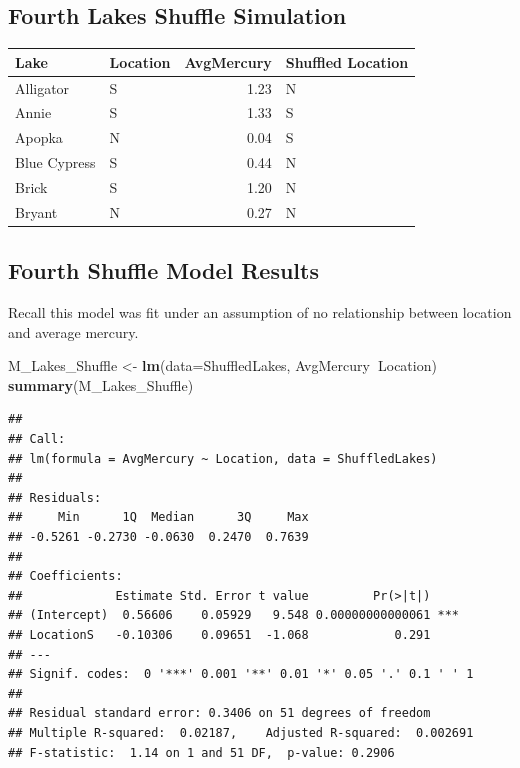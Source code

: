 \documentclass[]{book}
\newenvironment{Shaded}{\begin{snugshade}}{\end{snugshade}}
\newcommand{\KeywordTok}[1]{\textcolor[rgb]{0.13,0.29,0.53}{\textbf{#1}}}
\newcommand{\DataTypeTok}[1]{\textcolor[rgb]{0.13,0.29,0.53}{#1}}
\newcommand{\DecValTok}[1]{\textcolor[rgb]{0.00,0.00,0.81}{#1}}
\newcommand{\StringTok}[1]{\textcolor[rgb]{0.31,0.60,0.02}{#1}}
\newcommand{\OperatorTok}[1]{\textcolor[rgb]{0.81,0.36,0.00}{\textbf{#1}}}
\newcommand{\NormalTok}[1]{#1}
\begin{document}
\subsection{Fourth Lakes Shuffle
Simulation}\label{fourth-lakes-shuffle-simulation}

\begin{Shaded}
\end{Shaded}

\begin{tabular}{l|l|r|l}
\hline
Lake & Location & AvgMercury & Shuffled Location\\
\hline
Alligator & S & 1.23 & N\\
\hline
Annie & S & 1.33 & S\\
\hline
Apopka & N & 0.04 & S\\
\hline
Blue Cypress & S & 0.44 & N\\
\hline
Brick & S & 1.20 & N\\
\hline
Bryant & N & 0.27 & N\\
\hline
\end{tabular}

\subsection{Fourth Shuffle Model
Results}\label{fourth-shuffle-model-results}

Recall this model was fit under an assumption of no relationship between
location and average mercury.

\begin{Shaded}
\begin{Highlighting}[]
\NormalTok{M_Lakes_Shuffle <-}\StringTok{ }\KeywordTok{lm}\NormalTok{(}\DataTypeTok{data=}\NormalTok{ShuffledLakes, AvgMercury}\OperatorTok{~}\NormalTok{Location)}
\KeywordTok{summary}\NormalTok{(M_Lakes_Shuffle)}
\end{Highlighting}
\end{Shaded}

\begin{verbatim}
## 
## Call:
## lm(formula = AvgMercury ~ Location, data = ShuffledLakes)
## 
## Residuals:
##     Min      1Q  Median      3Q     Max 
## -0.5261 -0.2730 -0.0630  0.2470  0.7639 
## 
## Coefficients:
##             Estimate Std. Error t value         Pr(>|t|)    
## (Intercept)  0.56606    0.05929   9.548 0.00000000000061 ***
## LocationS   -0.10306    0.09651  -1.068            0.291    
## ---
## Signif. codes:  0 '***' 0.001 '**' 0.01 '*' 0.05 '.' 0.1 ' ' 1
## 
## Residual standard error: 0.3406 on 51 degrees of freedom
## Multiple R-squared:  0.02187,    Adjusted R-squared:  0.002691 
## F-statistic:  1.14 on 1 and 51 DF,  p-value: 0.2906
\end{verbatim}
\end{document}
